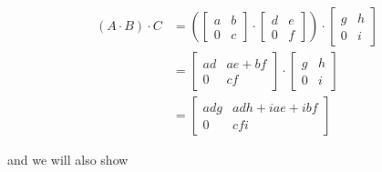 \documentclass{article}
\begin{document}
        \begin{equation*}
          \begin{split}
            (A \cdot B) \cdot C &= \left( 
              \begin{bmatrix}
                a & b\\
                0 & c
              \end{bmatrix} \cdot 
              \begin{bmatrix}
                d & e\\
                0 & f
              \end{bmatrix}
            \right) \cdot
            \begin{bmatrix} 
              g & h\\
              0 & i
            \end{bmatrix}\\
            &=
              \begin{bmatrix}
                ad & ae+bf\\
                0 & cf
              \end{bmatrix}
              \cdot
              \begin{bmatrix}
                g & h\\
                0 & i
              \end{bmatrix}\\
            &=
              \begin{bmatrix}
                adg & adh + iae + ibf\\
                0 & cfi
              \end{bmatrix}
          \end{split}
        \end{equation*}
      
      and we will also show 
\end{document}
